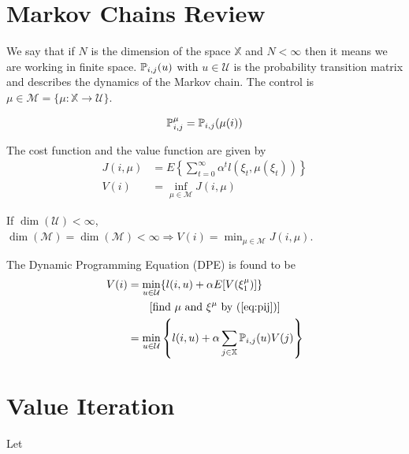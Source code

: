 \mainmatter%
\setcounter{page}{1}

\lectureseries[\course]{\course}

\date{November 3, 2009}

\setaddress%

\setcounter{lecture}{10}
\setcounter{chapter}{10}


\section{Markov Chains Review}
We say that if $N$ is the dimension of the space $\mathbb{X}$ and $N<\infty$ then it means we are working in finite space.
$\mathbb{P}_{i,j}(u)$ with $u\in\mathcal{U}$ is the probability transition matrix and describes the dynamics of the Markov chain.
The control is $\mu\in\mathcal{M} = \{\mu:\mathbb{X}\to\mathcal{U}\}$.

\begin{align}
\label{eq:pij}
\mathbb{P}_{i,j}^\mu = \mathbb{P}_{i,j}(\mu(i))
\end{align}

The cost function and the value function are given by
\begin{align*}
J(i,\mu) &= E\left\lbrace \sum_{t=0}^\infty \alpha^t l(\xi_t,\mu(\xi_t))\right\rbrace \\
V(i) &= \inf_{\mu\in\mathcal{M}}J(i,\mu)
\end{align*}

If $\dim(\mathcal{U})<\infty$, $\dim(\mathcal{M})=\dim(\mathcal{M})<\infty\Rightarrow V(i)=\min_{\mu\in\mathcal{M}}J(i,\mu)$.

The Dynamic Programming Equation (DPE) is found to be
\begin{align}
\label{eq:mcdpe}
V(i) &= \min_{u\in\mathcal{U}}\{l(i,u)+\alpha E[V(\xi_1^\mu)]\} \nonumber \\
&\qquad [\text{find~} \mu \text{~and~} \xi^\mu \text{~by~(\ref{eq:pij})}] \nonumber \\
&= \min_{u\in\mathcal{U}} \left\lbrace l(i,u)+\alpha\sum_{j\in\mathbb{X}}\mathbb{P}_{i,j}(u)V(j)\right\rbrace
\end{align}

\section{Value Iteration}
Let

